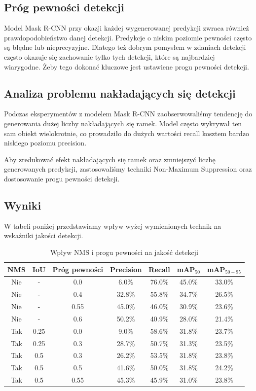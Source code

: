 \documentclass[licencjacka]{pracamgr}
\begin{document}
\subsection{Próg pewności detekcji}
Model Mask R-CNN przy okazji każdej wygenerowanej predykcji zwraca również prawdopodobieństwo danej detekcji.  Predykcje o niskim poziomie pewności często są błędne lub nieprecyzyjne. Dlatego też dobrym pomysłem w zdaniach detekcji często okazuje się zachowanie tylko tych detekcji, które są najbardziej wiarygodne. Żeby tego dokonać kluczowe jest ustawiene progu pewności detekcji.

\subsection{Analiza problemu nakładających się detekcji}
Podczas eksperymentów z modelem Mask R-CNN zaobserwowaliśmy tendencję do generowania dużej liczby nakładających się ramek. Model często wykrywał ten sam obiekt wielokrotnie, co prowadziło do dużych wartości recall kosztem bardzo niskiego poziomu precision.

Aby zredukować efekt nakładających się ramek oraz zmniejszyć liczbę generowanych predykcji, zastosowaliśmy techniki Non-Maximum Suppression  oraz dostosowanie progu pewności detekcji.   

\subsection{Wyniki}

W tabeli poniżej przedstawiamy wpływ wyżej wymienionych technik na wskaźniki jakości detekcji.  

\begin{table}[h]
    \centering
    \caption{Wpływ NMS i progu pewności na jakość detekcji}
    \label{tab:nms_results}
    \begin{tabular}{|c|c|c|c|c|c|c|}
        \hline
        \textbf{NMS} & \textbf{IoU} & \textbf{Próg pewności} & \textbf{Precision} & \textbf{Recall} & \textbf{mAP$_{50}$} & \textbf{mAP$_{50-95}$} \\
        \hline
        Nie & - & 0.0 & 6.0\% & 76.0\% & 45.0\% & 33.0\% \\
        Nie & - & 0.4 & 32.8\% & 55.8\% & 34.7\% & 26.5\% \\
        Nie & - & 0.55 & 45.0\% & 46.0\% & 30.9\% & 23.6\% \\
        Nie & - & 0.6 & 50.2\% & 40.9\% & 28.0\% & 21.4\% \\
        Tak & 0.25 & 0.0 & 9.0\% & 58.6\% & 31.8\% & 23.7\% \\
        Tak & 0.25 & 0.3 & 28.7\% & 50.7\% & 31.3\% & 23.5\% \\
        Tak & 0.5 & 0.3 & 26.2\% & 53.5\% & 31.8\% & 23.8\% \\
        Tak & 0.5 & 0.5 & 41.6\% & 50.0\% & 31.8\% & 24.2\% \\  
        Tak & 0.5 & 0.55 & 45.3\% & 45.9\% & 31.0\% & 23.8\% \\
        \hline
    \end{tabular}
\end{table}
\end{document}
